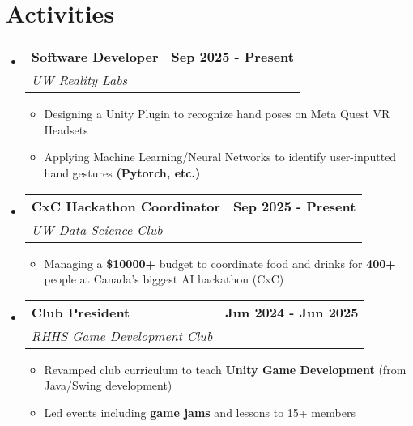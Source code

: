 \documentclass[letterpaper,11pt]{article}
\makeatletter
\newcommand{\resumeItem}[1]{
  \item\small{
    {#1 \vspace{-2pt}}
  }
}
\newcommand{\resumeSubheading}[4]{
  \vspace{-2pt}\item
    \begin{tabular*}{1.0\textwidth}[t]{l@{\extracolsep{\fill}}r}
      \textbf{#1} & \textbf{\small #2} \\
      \textit{\small#3} & \textit{\small #4} \\
    \end{tabular*}\vspace{-7pt}
}
\newcommand{\resumeSubHeadingListStart}{\begin{itemize}[leftmargin=0.0in, label={}]}
\newcommand{\resumeSubHeadingListEnd}{\end{itemize}}
\newcommand{\resumeItemListStart}{\begin{itemize}}
\newcommand{\resumeItemListEnd}{\end{itemize}\vspace{-5pt}}
\makeatother
\begin{document}
\section{Activities}
\resumeSubHeadingListStart
    \resumeSubheading
    {\textbf{Software Developer} } {Sep 2025 - Present}
    {UW Reality Labs}{}
    \resumeItemListStart
        \resumeItem{Designing a Unity Plugin to recognize hand poses on Meta Quest VR Headsets}
        \resumeItem{Applying Machine Learning/Neural Networks to identify user-inputted hand gestures \textbf{(Pytorch, etc.)}}
    \resumeItemListEnd
    \resumeSubheading
    {\textbf{CxC Hackathon Coordinator} } {Sep 2025 - Present}
    {UW Data Science Club}{}
    \resumeItemListStart
        \resumeItem{Managing a \textbf{\$10000+} budget to coordinate food and drinks for \textbf{400+} people at Canada's biggest AI hackathon (CxC)}
    \resumeItemListEnd
    \resumeSubheading
    {Club President} {Jun 2024 - Jun 2025}
    {RHHS Game Development Club}{}
    \resumeItemListStart
        \resumeItem{Revamped club curriculum to teach \textbf{Unity Game Development} (from Java/Swing development)}
        \resumeItem{Led events including \textbf{game jams} and lessons to 15+ members}
    \resumeItemListEnd
\resumeSubHeadingListEnd
\vspace{-16pt}

\end{document}
